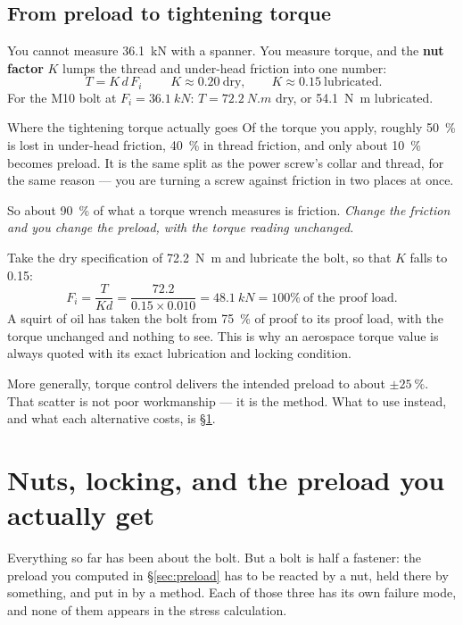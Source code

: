 \documentclass[11pt,a4paper]{article}
\begin{document}
\subsection{From preload to tightening torque}\label{sec:torque}

You cannot measure \SI{36.1}{kN} with a spanner. You measure torque, and the \textbf{nut factor} $K$
lumps the thread and under-head friction into one number:
\[
\boxed{\;T = K\,d\,F_i\;}\qquad K\approx0.20 \ \text{dry},\qquad K\approx0.15 \ \text{lubricated}.
\]
For the M10 bolt at $F_i=\SI{36.1}{kN}$: $T = \SI{72.2}{N.m}$ dry, or \SI{54.1}{N.m} lubricated.

\begin{keybox}{Where the tightening torque actually goes}
Of the torque you apply, roughly \SI{50}{\percent} is lost in under-head friction, \SI{40}{\percent}
in thread friction, and only about \SI{10}{\percent} becomes preload. It is the same split as the
power screw's collar and thread, for the same reason --- you are turning a screw against friction in
two places at once.

\medskip
So about \SI{90}{\percent} of what a torque wrench measures is friction. \emph{Change the friction and
you change the preload, with the torque reading unchanged.}
\end{keybox}

\medskip
Take the dry specification of \SI{72.2}{N.m} and lubricate the bolt, so that $K$ falls to 0.15:
\[
F_i = \frac{T}{Kd} = \frac{72.2}{0.15\times0.010} = \SI{48.1}{kN} = 100\%\ \text{of the proof load}.
\]
A squirt of oil has taken the bolt from \SI{75}{\percent} of proof to its proof load, with the torque
unchanged and nothing to see. This is why an aerospace torque value is always quoted with its exact
lubrication and locking condition.

\medskip
More generally, torque control delivers the intended preload to about $\pm\SI{25}{\percent}$.
That scatter is not poor workmanship --- it is the method. What to use instead, and what each
alternative costs, is \S\ref{sec:nuts}.

\section{Nuts, locking, and the preload you actually get}
\label{sec:nuts}

Everything so far has been about the bolt. But a bolt is half a fastener: the preload you computed in
\S\ref{sec:preload} has to be reacted by a nut, held there by something, and put in by a method. Each
of those three has its own failure mode, and none of them appears in the stress calculation.
\end{document}
